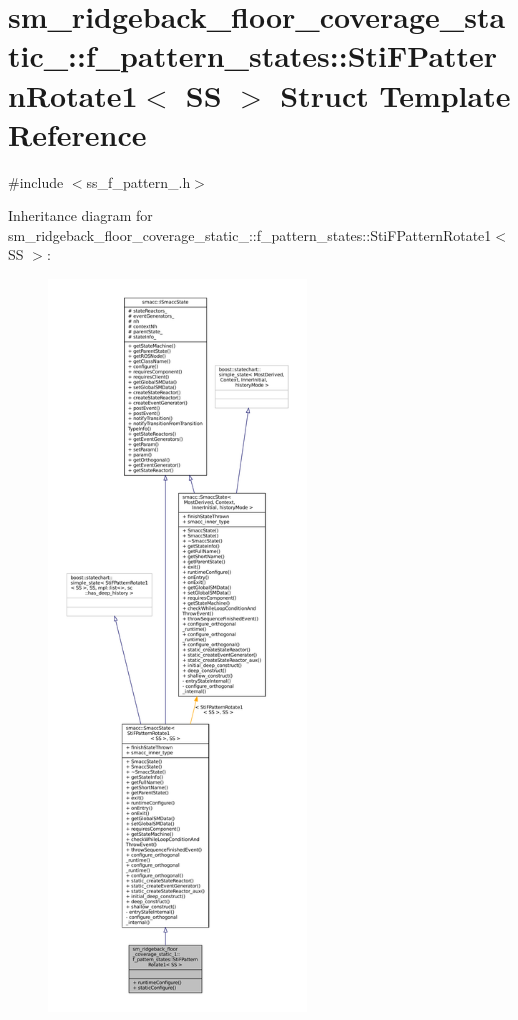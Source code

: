 \hypertarget{classsm__ridgeback__floor__coverage__static__1_1_1f__pattern__states_1_1StiFPatternRotate1}{}\section{sm\+\_\+ridgeback\+\_\+floor\+\_\+coverage\+\_\+static\+\_\+:\+:f\+\_\+pattern\+\_\+states\+:\+:Sti\+F\+Pattern\+Rotate1$<$ SS $>$ Struct Template Reference}
\label{classsm__ridgeback__floor__coverage__static__1_1_1f__pattern__states_1_1StiFPatternRotate1}


{\ttfamily \#include $<$ss\+\_\+f\+\_\+pattern\+\_.\+h$>$}



Inheritance diagram for sm\+\_\+ridgeback\+\_\+floor\+\_\+coverage\+\_\+static\+\_\+:\+:f\+\_\+pattern\+\_\+states\+:\+:Sti\+F\+Pattern\+Rotate1$<$ SS $>$\+:
\nopagebreak
\begin{figure}[H]
\begin{center}
\leavevmode
\includegraphics[height=550pt]{classsm__ridgeback__floor__coverage__static__1_1_1f__pattern__states_1_1StiFPatternRotate1__inherit__graph}
\end{center}
\end{figure}


